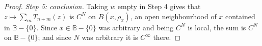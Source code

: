 \begin{proof}
\emph{Step 5: conclusion.}  Taking $w$ empty in Step 4 gives that
$z\mapsto\sum_mT_{n+m}(z)$ is $C^{N}$ on $B(x,\rho_x)$, an open neighbourhood
of $x$ contained in $\mathbb{B}-\{0\}$.  Since $x\in\mathbb{B}-\{0\}$ was
arbitrary and being $C^{N}$ is local, the sum is $C^{N}$ on
$\mathbb{B}-\{0\}$; and since $N$ was arbitrary it is $C^\infty$ there.
\end{proof}

